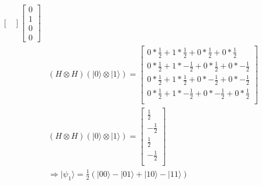 \documentclass{article}
\begin{document}
\begin{equation}
\begin{split}
\begin{bmatrix}
    \end{bmatrix}\begin{bmatrix} 0 \\ 1 \\ 0 \\ 0 \end{bmatrix} \\
    & (H \otimes H)(|0\rangle \otimes |1\rangle) = \begin{bmatrix}
        0*\frac{1}{2}+1*\frac{1}{2}+0*\frac{1}{2}+0*\frac{1}{2} \\
        0*\frac{1}{2}+1*-\frac{1}{2}+0*\frac{1}{2}+0*-\frac{1}{2} \\
        0*\frac{1}{2}+1*\frac{1}{2}+0*-\frac{1}{2}+0*-\frac{1}{2} \\
        0*\frac{1}{2}+1*-\frac{1}{2}+0*-\frac{1}{2}+0*\frac{1}{2} \\
    \end{bmatrix} \\
    & (H \otimes H)(|0\rangle \otimes |1\rangle) = \begin{bmatrix}
        \frac{1}{2} \\
        -\frac{1}{2} \\
        \frac{1}{2} \\
        -\frac{1}{2} \\
    \end{bmatrix} \\
    & \Longrightarrow |\psi_1\rangle = \frac{1}{2}(|00\rangle - |01\rangle + |10\rangle - |11\rangle)
\end{split}
\end{equation}
\end{document}
